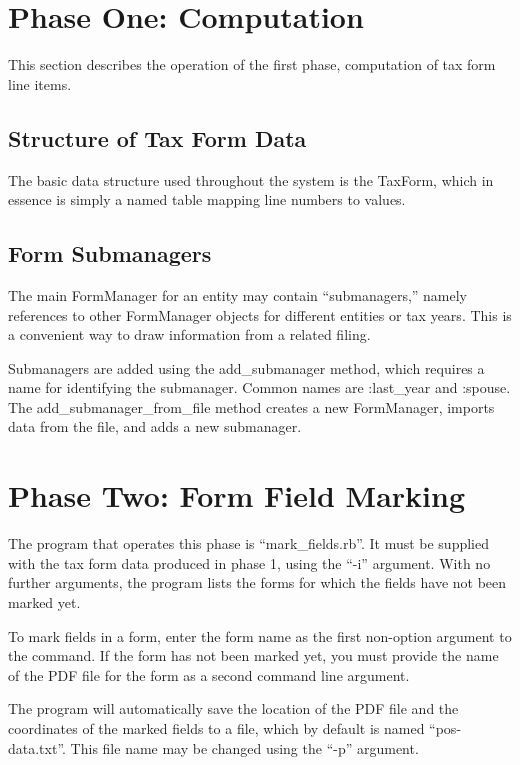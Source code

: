 \documentclass[12pt]{article}
\begin{document}
\section{Phase One: Computation}

This section describes the operation of the first phase, computation of tax form
line items.

\subsection{Structure of Tax Form Data}

The basic data structure used throughout the system is the TaxForm, which in
essence is simply a named table mapping line numbers to values.



\subsection{Form Submanagers}

The main FormManager for an entity may contain ``submanagers,'' namely
references to other FormManager objects for different entities or tax years.
This is a convenient way to draw information from a related filing.

Submanagers are added using the add\_submanager method, which requires a name
for identifying the submanager. Common names are :last\_year and :spouse. The
add\_submanager\_from\_file method creates a new FormManager, imports data from
the file, and adds a new submanager.


\section{Phase Two: Form Field Marking}

The program that operates this phase is ``mark\_fields.rb''. It must be supplied
with the tax form data produced in phase 1, using the ``-i'' argument. With no
further arguments, the program lists the forms for which the fields have not
been marked yet.

To mark fields in a form, enter the form name as the first non-option argument
to the command. If the form has not been marked yet, you must provide the name
of the PDF file for the form as a second command line argument.

The program will automatically save the location of the PDF file and the
coordinates of the marked fields to a file, which by default is named
``pos-data.txt''. This file name may be changed using the ``-p'' argument.
\end{document}
